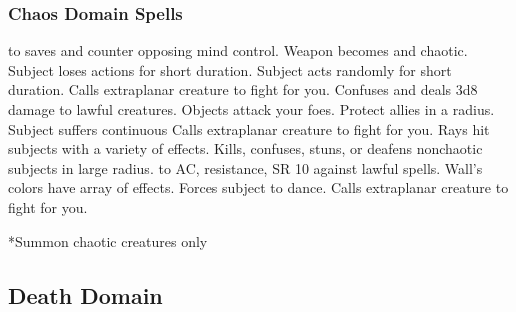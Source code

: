 \subsubsection{Chaos Domain Spells}
\begin{spelllist}
    to saves and counter opposing mind control.
   Weapon becomes  and chaotic.
   Subject loses actions for short duration.
   Subject acts randomly for short duration.
   Calls extraplanar creature to fight for you.
   Confuses and deals 3d8 damage to lawful creatures.
   Objects attack your foes.
   Protect allies in a \areamed radius.
   Subject suffers continuous 
   Calls extraplanar creature to fight for you.
   Rays hit subjects with a variety of effects.
   Kills, confuses, stuns, or deafens nonchaotic subjects in large radius.
  \F {} to AC,  resistance, SR 10 against lawful spells.
   Wall's colors have array of effects.
   Forces subject to dance.
   Calls extraplanar creature to fight for you.
\end{spelllist}
*Summon chaotic creatures only

\subsection{Death Domain}

